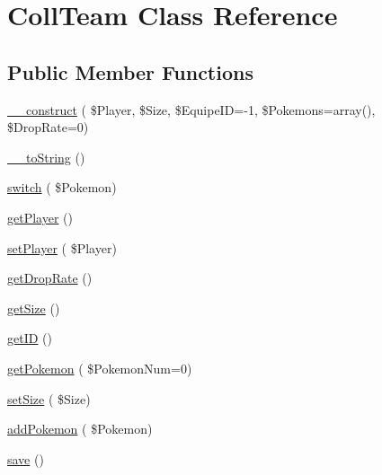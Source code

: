 \hypertarget{class_coll_team}{}\section{Coll\+Team Class Reference}
\label{class_coll_team}
\subsection*{Public Member Functions}
\begin{DoxyCompactItemize}
\item 
\hyperlink{class_coll_team_a18ec563c5475dbf786001ab4b4ddf5e1}{\+\_\+\+\_\+construct} ( \$Player, \$Size, \$Equipe\+ID=-\/1, \$Pokemons=array(), \$Drop\+Rate=0)
\item 
\hyperlink{class_coll_team_a509cdab3b445595b0a966d425e00464a}{\+\_\+\+\_\+to\+String} ()
\item 
\hyperlink{class_coll_team_aaaa6a70bcd9dc9228d30f9ea02064b50}{switch} ( \$Pokemon)
\item 
\hyperlink{class_coll_team_ad24055af018ae4cc71df690017bf831a}{get\+Player} ()
\item 
\hyperlink{class_coll_team_a233f56aa60b823e4480dc3e5828cfd36}{set\+Player} ( \$Player)
\item 
\hyperlink{class_coll_team_af9480eb8f8e9f13225d637228ec58af6}{get\+Drop\+Rate} ()
\item 
\hyperlink{class_coll_team_a211b8c10a766e5063fd8f2cb0489e9e8}{get\+Size} ()
\item 
\hyperlink{class_coll_team_a6d55a9b5373a7b8905de9d695c419c63}{get\+ID} ()
\item 
\hyperlink{class_coll_team_ae1e4060b9948048d96ee81555936f04a}{get\+Pokemon} ( \$Pokemon\+Num=0)
\item 
\hyperlink{class_coll_team_aa8d01c40ed16ef4aee3a6c7ccc468993}{set\+Size} ( \$Size)
\item 
\hyperlink{class_coll_team_af5b06e3dd4ea23759930780ab4801ff4}{add\+Pokemon} ( \$Pokemon)
\item 
\hyperlink{class_coll_team_a6dad47a2d2c75f8d404303ee172cae8b}{save} ()
\end{DoxyCompactItemize}
